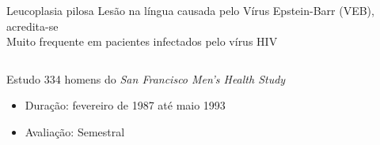 \documentclass[ignorenonframetext,]{beamer}
\begin{document}
\begin{frame}

\vspace{.25cm}

\pause

\begin{block}{Leucoplasia pilosa}
 \pause
 \vspace{-.2cm}
 Lesão na língua causada pelo Vírus Epstein-Barr (VEB), acredita-se \\
 \vspace{.2cm}
 Muito frequente em pacientes infectados pelo vírus HIV
\end{block}

\vspace{.1cm}\begin{columns}
 \begin{column}{.4\textwidth}

\pause
  \begin{block}{Estudo}
   334 homens do \textit{San Francisco Men's Health Study}
  \pause
   \begin{itemize}
    \item Duração: fevereiro de 1987 até maio 1993
    \item Avaliação: Semestral
   \end{itemize}
  \end{block}
 
 \end{column}
\end{columns}

\end{frame}
\end{document}
